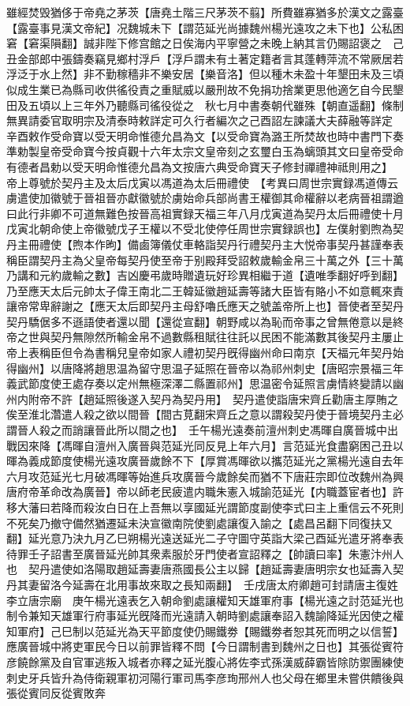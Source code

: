 雖經焚毁猶侈于帝堯之茅茨【唐堯土階三尺茅茨不翦】所費雖寡猶多於漢文之露臺【露臺事見漢文帝紀】况魏城未下【謂范延光尚據魏州楊光遠攻之未下也】公私困窘【窘渠隕翻】誠非陛下修宫館之日俟海内平寧營之未晚上納其言仍賜詔褒之　己丑金部郎中張鑄奏竊見鄉村浮戶【浮戶謂未有土著定籍者言其蓬轉萍流不常厥居若浮泛于水上然】非不勤稼穡非不樂安居【樂音洛】但以種木未盈十年墾田未及三頃似成生業已為縣司收供徭役責之重賦威以嚴刑故不免捐功捨業更思他適乞自今民墾田及五頃以上三年外乃聽縣司徭役從之　秋七月中書奏朝代雖殊【朝直遥翻】條制無異請委官取明宗及清泰時敕詳定可久行者編次之己酉詔左諫議大夫薛融等詳定　辛酉敕作受命寶以受天明命惟德允昌為文【以受命寶為潞王所焚故也時中書門下奏準勅製皇帝受命寶今按貞觀十六年太宗文皇帝刻之玄璽白玉為螭頭其文曰皇帝受命有德者昌勅以受天明命惟德允昌為文按唐六典受命寶天子修封禪禮神祗則用之】　帝上尊號於契丹主及太后戊寅以馮道為太后冊禮使　【考異曰周世宗實録馮道傳云虜遣使加徽號于晉祖晉亦獻徽號於虜始命兵部尚書王權御其命權辭以老病晉祖謂遒曰此行非卿不可道無難色按晉高祖實録天福三年八月戊寅道為契丹太后冊禮使十月戊寅北朝命使上帝徽號戊子王權以不受北使停任周世宗實録誤也】左僕射劉煦為契丹主冊禮使【煦本作昫】備鹵簿儀仗車輅詣契丹行禮契丹主大悦帝事契丹甚謹奉表稱臣謂契丹主為父皇帝每契丹使至帝于别殿拜受詔敕歲輸金帛三十萬之外【三十萬乃講和元約歲輸之數】吉凶慶弔歲時贈遺玩好珍異相繼于道【遺唯季翻好呼到翻】乃至應天太后元帥太子偉王南北二王韓延徽趙延壽等諸大臣皆有賂小不如意輒來責讓帝常卑辭謝之【應天太后即契丹主母舒嚕氏應天之號盖帝所上也】晉使者至契丹契丹驕倨多不遜語使者還以聞【還從宣翻】朝野咸以為恥而帝事之曾無倦意以是終帝之世與契丹無隙然所輸金帛不過數縣租賦往往託以民困不能滿數其後契丹主屢止帝上表稱臣但令為書稱兒皇帝如家人禮初契丹旣得幽州命曰南京【天福元年契丹始得幽州】以唐降將趙思温為留守思温子延照在晉帝以為祁州刺史【唐昭宗景福三年義武節度使王處存奏以定州無極深澤二縣置祁州】思温密令延照言虜情終變請以幽州内附帝不許【趙延照後遂入契丹為契丹用】　契丹遣使詣唐宋齊丘勸唐主厚賄之俟至淮北濳遣人殺之欲以間晉【間古莧翻宋齊丘之意以謂殺契丹使于晉境契丹主必謂晉人殺之而誚讓晉此所以間之也】　壬午楊光遠奏前澶州刺史馮暉自廣晉城中出戰因來降【馮暉自澶州入廣晉與范延光同反見上年六月】言范延光食盡窮困己丑以暉為義成節度使楊光遠攻廣晉歲餘不下【厚賞馮暉欲以攜范延光之黨楊光遠自去年六月攻范延光七月破馮暉等始進兵攻廣晉今歲餘矣而猶不下唐莊宗即位改魏州為興唐府帝革命改為廣晉】帝以師老民疲遣内職朱憲入城諭范延光【内職蓋宦者也】許移大藩曰若降而殺汝白日在上吾無以享國延光謂節度副使李式曰主上重信云不死則不死矣乃撤守備然猶遷延未決宣徽南院使劉處讓復入諭之【處昌呂翻下同復扶又翻】延光意乃決九月乙巳朔楊光遠送延光二子守圖守英詣大梁己酉延光遣牙將奉表待罪壬子詔書至廣晉延光帥其衆素服於牙門使者宣詔釋之【帥讀曰率】朱憲汴州人也　契丹遣使如洛陽取趙延壽妻唐燕國長公主以歸【趙延壽妻唐明宗女也延壽入契丹其妻留洛今延壽在北用事故來取之長知兩翻】　壬戌唐太府卿趙可封請唐主復姓李立唐宗廟　庚午楊光遠表乞入朝命劉處讓權知天雄軍府事【楊光遠之討范延光也制令兼知天雄軍行府事延光旣降而光遠請入朝時劉處讓奉詔入魏諭降延光因使之權知軍府】己巳制以范延光為天平節度使仍賜鐵劵【賜鐵劵者恕其死而明之以信誓】應廣晉城中將吏軍民今日以前罪皆釋不問【今日謂制書到魏州之日也】其張從賓符彦饒餘黨及自官軍逃叛入城者亦釋之延光腹心將佐李式孫漢威薛霸皆除防禦團練使刺史牙兵皆升為侍衛親軍初河陽行軍司馬李彦珣邢州人也父母在鄉里未嘗供饋後與張從賓同反從賓敗奔